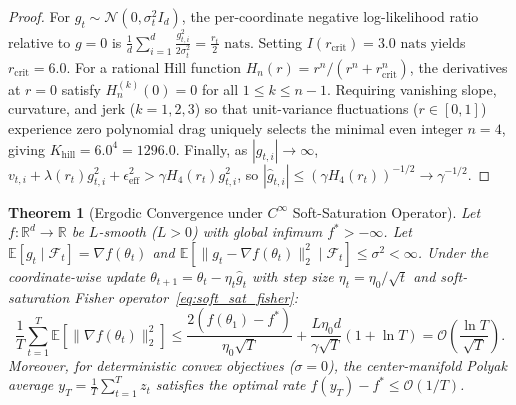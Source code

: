 \documentclass[10pt,twocolumn,letterpaper]{article}
\newtheorem{theorem}{Theorem}[section]
\theoremstyle{definition}
\theoremstyle{remark}
\newcommand{\R}{\mathbb{R}}
\newcommand{\E}{\mathbb{E}}
\newcommand{\epseff}{\epsilon_{\mathrm{eff}}}
\begin{document}
\begin{proof}
For $g_t \sim \mathcal{N}(0, \sigma_t^2 I_d)$, the per-coordinate negative log-likelihood ratio relative to $g=0$ is $\frac{1}{d}\sum_{i=1}^d \frac{g_{t,i}^2}{2\sigma_t^2} = \frac{r_t}{2}\text{ nats}$. Setting $I(r_{\mathrm{crit}}) = 3.0\text{ nats}$ yields $r_{\mathrm{crit}} = 6.0$. For a rational Hill function $H_n(r) = r^n / (r^n + r_{\mathrm{crit}}^n)$, the derivatives at $r=0$ satisfy $H_n^{(k)}(0) = 0$ for all $1 \le k \le n-1$. Requiring vanishing slope, curvature, and jerk ($k=1,2,3$) so that unit-variance fluctuations ($r \in [0, 1]$) experience zero polynomial drag uniquely selects the minimal even integer $n=4$, giving $K_{\mathrm{hill}} = 6.0^4 = 1296.0$. Finally, as $|g_{t,i}| \to \infty$, $v_{t,i} + \lambda(r_t)g_{t,i}^2 + \epseff^2 > \gamma H_4(r_t) g_{t,i}^2$, so $|\hat{g}_{t,i}| \le (\gamma H_4(r_t))^{-1/2} \to \gamma^{-1/2}$.
\end{proof}

\begin{theorem}[Ergodic Convergence under $C^\infty$ Soft-Saturation Operator]
\label{thm:convergence_rate}
Let $f: \R^d \to \R$ be $L$-smooth ($L > 0$) with global infimum $f^* > -\infty$. Let $\E[g_t \mid \mathcal{F}_t] = \nabla f(\theta_t)$ and $\E[\|g_t - \nabla f(\theta_t)\|_2^2 \mid \mathcal{F}_t] \le \sigma^2 < \infty$. Under the coordinate-wise update $\theta_{t+1} = \theta_t - \eta_t \hat{g}_t$ with step size $\eta_t = \eta_0 / \sqrt{t}$ and soft-saturation Fisher operator~\eqref{eq:soft_sat_fisher}:
\begin{equation}
  \frac{1}{T}\sum_{t=1}^T \E\left[\|\nabla f(\theta_t)\|_2^2\right] \le \frac{2(f(\theta_1) - f^*)}{\eta_0 \sqrt{T}} + \frac{L \eta_0 d}{\gamma \sqrt{T}}\left(1 + \ln T\right) = \mathcal{O}\left(\frac{\ln T}{\sqrt{T}}\right).
  \label{eq:ergodic_bound}
\end{equation}
Moreover, for deterministic convex objectives ($\sigma=0$), the center-manifold Polyak average $y_T = \frac{1}{T}\sum_{t=1}^T z_t$ satisfies the optimal rate $f(y_T) - f^* \le \mathcal{O}(1/T)$.
\end{theorem}
\end{document}
